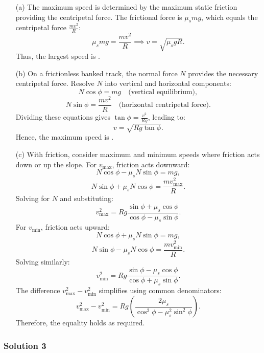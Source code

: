 \documentclass{article}
\begin{document}
\begin{enumerate}
    \item[(a)] The maximum speed is determined by the maximum static friction providing the centripetal force. The frictional force is \( \mu_s mg \), which equals the centripetal force \( \frac{mv^2}{R} \):
        \[
        \mu_s mg = \frac{mv^2}{R} \implies v = \sqrt{\mu_s g R}.
        \]
        Thus, the largest speed is .
    
    \item[(b)] On a frictionless banked track, the normal force \( N \) provides the necessary centripetal force. Resolve \( N \) into vertical and horizontal components:
        \[
        N \cos\phi = mg \quad \text{(vertical equilibrium)},
        \]
        \[
        N \sin\phi = \frac{mv^2}{R} \quad \text{(horizontal centripetal force)}.
        \]
        Dividing these equations gives \( \tan\phi = \frac{v^2}{Rg} \), leading to:
        \[
        v = \sqrt{Rg \tan\phi}.
        \]
        Hence, the maximum speed is .
    
    \item[(c)] With friction, consider maximum and minimum speeds where friction acts down or up the slope. For \( v_{\text{max}} \), friction acts downward:
        \[
        N \cos\phi - \mu_s N \sin\phi = mg,
        \]
        \[
        N \sin\phi + \mu_s N \cos\phi = \frac{mv_{\text{max}}^2}{R}.
        \]
        Solving for \( N \) and substituting:
        \[
        v_{\text{max}}^2 = Rg \frac{\sin\phi + \mu_s \cos\phi}{\cos\phi - \mu_s \sin\phi}.
        \]
        For \( v_{\text{min}} \), friction acts upward:
        \[
        N \cos\phi + \mu_s N \sin\phi = mg,
        \]
        \[
        N \sin\phi - \mu_s N \cos\phi = \frac{mv_{\text{min}}^2}{R}.
        \]
        Solving similarly:
        \[
        v_{\text{min}}^2 = Rg \frac{\sin\phi - \mu_s \cos\phi}{\cos\phi + \mu_s \sin\phi}.
        \]
        The difference \( v_{\text{max}}^2 - v_{\text{min}}^2 \) simplifies using common denominators:
        \[
        v_{\text{max}}^2 - v_{\text{min}}^2 = Rg \left( \frac{2\mu_s}{\cos^2\phi - \mu_s^2 \sin^2\phi} \right).
        \]
        Therefore, the equality holds as required.
\end{enumerate}

\subsubsection{Solution 3}
\end{document}
